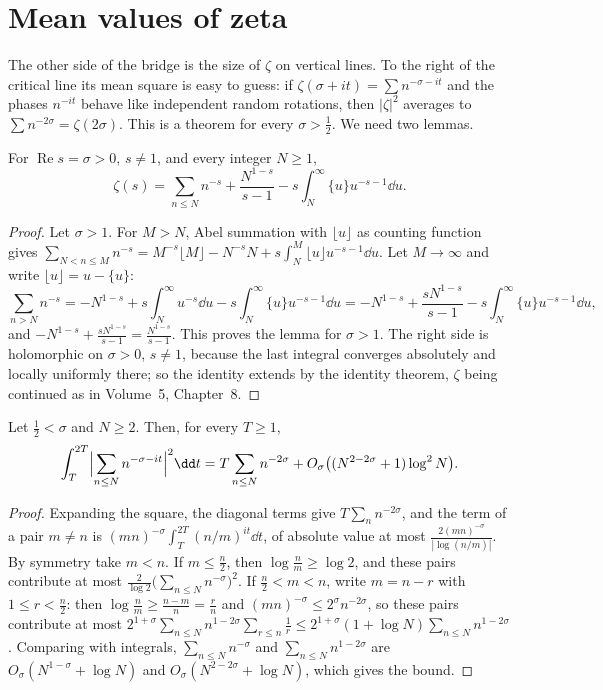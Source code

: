 \section{Mean values of zeta}

The other side of the bridge is the size of $\zeta$ on vertical lines. To the right of the critical line its mean square is easy to guess: if
$\zeta(\sigma+it)=\sum n^{-\sigma-it}$ and the phases $n^{-it}$ behave like independent random rotations, then $|\zeta|^2$ averages to
$\sum n^{-2\sigma}=\zeta(2\sigma)$. This is a theorem for every $\sigma>\frac12$. We need two lemmas.

\begin{lemma}\label{moments:lem:zetaapprox}
For $\operatorname{Re}s=\sigma>0$, $s\ne1$, and every integer $N\ge1$,
\[
\zeta(s)=\sum_{n\le N}n^{-s}+\frac{N^{1-s}}{s-1}-s\int_N^\infty\{u\}u^{-s-1}\dd u.
\]
\end{lemma}
\begin{proof}
Let $\sigma>1$. For $M>N$, Abel summation with $\lfloor u\rfloor$ as counting function gives
$\sum_{N<n\le M}n^{-s}=M^{-s}\lfloor M\rfloor-N^{-s}N+s\int_N^M\lfloor u\rfloor u^{-s-1}\dd u$. Let $M\to\infty$ and write $\lfloor u\rfloor=u-\{u\}$:
\[
\sum_{n>N}n^{-s}=-N^{1-s}+s\int_N^\infty u^{-s}\dd u-s\int_N^\infty\{u\}u^{-s-1}\dd u=-N^{1-s}+\frac{sN^{1-s}}{s-1}-s\int_N^\infty\{u\}u^{-s-1}\dd u,
\]
and $-N^{1-s}+\frac{sN^{1-s}}{s-1}=\frac{N^{1-s}}{s-1}$. This proves the lemma for $\sigma>1$. The right side is holomorphic on $\sigma>0$, $s\ne1$, because the last
integral converges absolutely and locally uniformly there; so the identity extends by the identity theorem, $\zeta$ being continued as in Volume~5,
Chapter~8.
\end{proof}

\begin{lemma}\label{moments:lem:dirmeanvalue}
Let $\frac12<\sigma$ and $N\ge2$. Then, for every $T\ge1$,
\[
\int_T^{2T}\Bigl|\sum_{n\le N}n^{-\sigma-it}\Bigr|^2\dd t=T\sum_{n\le N}n^{-2\sigma}+O_\sigma\bigl((N^{2-2\sigma}+1)\log^2N\bigr).
\]
\end{lemma}
\begin{proof}
Expanding the square, the diagonal terms give $T\sum_nn^{-2\sigma}$, and the term of a pair $m\ne n$ is $(mn)^{-\sigma}\int_T^{2T}(n/m)^{it}\dd t$, of absolute value at
most $\frac{2(mn)^{-\sigma}}{|\log(n/m)|}$. By symmetry take $m<n$. If $m\le\frac n2$, then $\log\frac nm\ge\log2$, and these pairs contribute at most
$\frac2{\log2}\bigl(\sum_{n\le N}n^{-\sigma}\bigr)^2$. If $\frac n2<m<n$, write $m=n-r$ with $1\le r<\frac n2$: then $\log\frac nm\ge\frac{n-m}n=\frac rn$ and
$(mn)^{-\sigma}\le2^\sigma n^{-2\sigma}$, so these pairs contribute at most $2^{1+\sigma}\sum_{n\le N}n^{1-2\sigma}\sum_{r\le n}\frac1r\le2^{1+\sigma}(1+\log N)\sum_{n\le N}n^{1-2\sigma}$.
Comparing with integrals, $\sum_{n\le N}n^{-\sigma}$ and $\sum_{n\le N}n^{1-2\sigma}$ are $O_\sigma(N^{1-\sigma}+\log N)$ and $O_\sigma(N^{2-2\sigma}+\log N)$, which gives the bound.
\end{proof}

